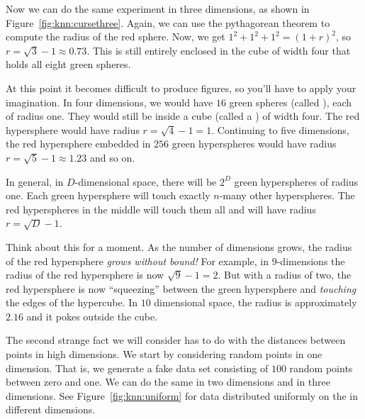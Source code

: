 
Now we can do the same experiment in three dimensions, as shown in
Figure~\ref{fig:knn:cursethree}.  Again, we can use the pythagorean
theorem to compute the radius of the red sphere.  Now, we get $1^2 +
1^2 + 1^2 = (1+r)^2$, so $r = \sqrt3 - 1 \approx 0.73$.  This is still
entirely enclosed in the cube of width four that holds all eight green
spheres.

At this point it becomes difficult to produce figures, so you'll have
to apply your imagination.  In four dimensions, we would have $16$
green spheres (called ), each of radius one.
They would still be inside a cube (called a ) of
width four.  The red hypersphere would have radius $r = \sqrt4 - 1 =
1$.  Continuing to five dimensions, the red hypersphere embedded in
$256$ green hyperspheres would have radius $r = \sqrt5-1 \approx 1.23$
and so on.

In general, in $D$-dimensional space, there will be $2^D$ green
hyperspheres of radius one.  Each green hypersphere will touch exactly
$n$-many other hyperspheres.  The red hyperspheres in the middle will
touch them all and will have radius $r = \sqrt D - 1$.

Think about this for a moment.  As the number of dimensions grows, the
radius of the red hypersphere \emph{grows without bound!} For
example, in $9$-dimensions the radius of the red hypersphere is now
$\sqrt9-1 = 2$.  But with a radius of two, the red hypersphere is now
``squeezing'' between the green hypersphere and \emph{touching} the
edges of the hypercube.  In $10$ dimensional space, the radius is
approximately $2.16$ and it pokes outside the cube.




The second strange fact we will consider has to do with the distances
between points in high dimensions.  We start by considering random
points in one dimension.  That is, we generate a fake data set
consisting of $100$ random points between zero and one.  We can do the
same in two dimensions and in three dimensions.  See
Figure~\ref{fig:knn:uniform} for data distributed uniformly on the
 in different dimensions.


